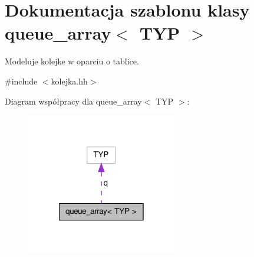 \hypertarget{classqueue__array}{\section{\-Dokumentacja szablonu klasy queue\-\_\-array$<$ \-T\-Y\-P $>$}
\label{classqueue__array}
}


\-Modeluje kolejke w oparciu o tablice.  




{\ttfamily \#include $<$kolejka.\-hh$>$}



\-Diagram współpracy dla queue\-\_\-array$<$ \-T\-Y\-P $>$\-:
\nopagebreak
\begin{figure}[H]
\begin{center}
\leavevmode
\includegraphics[width=186pt]{classqueue__array__coll__graph}
\end{center}
\end{figure}
